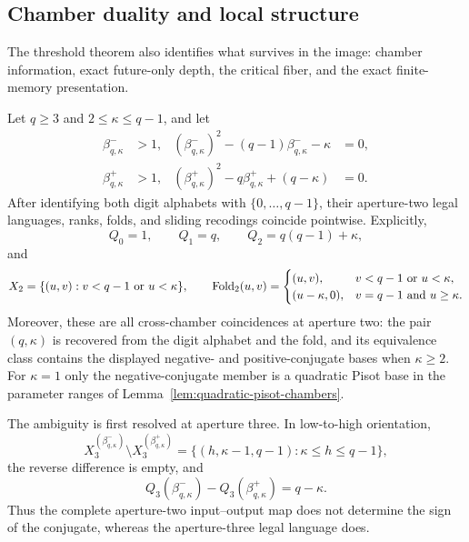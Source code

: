 \subsection{Chamber duality and local structure}

The threshold theorem also identifies what survives in the image: chamber
information, exact future-only depth, the critical
fiber, and the exact finite-memory presentation.

\begin{theorem}
\label{thm:quadratic-aperture-two-duality}
Let $q\ge3$ and $2\le\kappa\le q-1$, and let
\begin{align*}
\beta^-_{q,\kappa}&>1,
& (\beta^-_{q,\kappa})^2-(q-1)\beta^-_{q,\kappa}-\kappa&=0,\\
\beta^+_{q,\kappa}&>1,
& (\beta^+_{q,\kappa})^2-q\beta^+_{q,\kappa}+(q-\kappa)&=0.
\end{align*}
After identifying both digit alphabets with $\{0,\ldots,q-1\}$, their
aperture-two legal languages, ranks, folds, and sliding recodings coincide
pointwise.  Explicitly,
\[
Q_0=1,\qquad Q_1=q,\qquad Q_2=q(q-1)+\kappa,
\]
and
\[
X_2=\{(u,v):v<q-1\ \hbox{or}\ u<\kappa\},
\qquad
\Fold_2(u,v)=
\begin{cases}
(u,v),&v<q-1\ \hbox{or}\ u<\kappa,\\
(u-\kappa,0),&v=q-1\ \hbox{and}\ u\ge\kappa.
\end{cases}
\]
Moreover, these are all cross-chamber coincidences at aperture two: the pair
$(q,\kappa)$ is recovered from the digit alphabet and the fold, and its
equivalence class contains the displayed negative- and positive-conjugate
bases when $\kappa\ge2$.  For $\kappa=1$ only the negative-conjugate member
is a quadratic Pisot base in the parameter ranges of
Lemma~\ref{lem:quadratic-pisot-chambers}.

The ambiguity is first resolved at aperture three.  In low-to-high
orientation,
\[
X_3^{(\beta^-_{q,\kappa})}
 \setminus X_3^{(\beta^+_{q,\kappa})}
=\{(h,\kappa-1,q-1):\kappa\le h\le q-1\},
\]
the reverse difference is empty, and
\[
Q_3(\beta^-_{q,\kappa})-Q_3(\beta^+_{q,\kappa})=q-\kappa.
\]
Thus the complete aperture-two input--output map does not determine the sign
of the conjugate, whereas the aperture-three legal language does.
\end{theorem}

